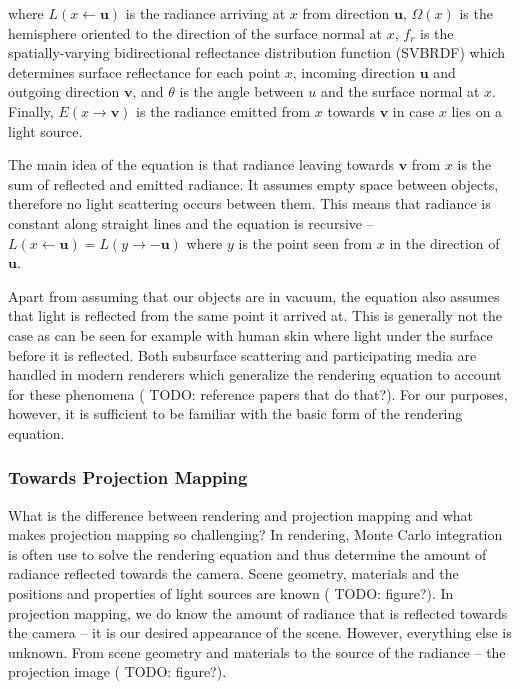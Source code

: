 where \(L(x \leftarrow \mathbf{u})\) is the radiance arriving at \(x\) from direction \(\mathbf{u}\), \(\Omega(x)\) is the hemisphere oriented to the direction of the surface normal at \(x\), \(f_r\) is the spatially-varying bidirectional reflectance distribution function (SVBRDF) which determines surface reflectance for each point \(x\), incoming direction \(\mathbf{u}\) and outgoing direction \(\mathbf{v}\), and \(\theta\) is the angle between \(u\) and the surface normal at \(x\). Finally, \(E(x \rightarrow \mathbf{v})\) is the radiance emitted from \(x\) towards \(\mathbf{v}\) in case \(x\) lies on a light source.

The main idea of the equation is that radiance leaving towards \(\mathbf{v}\) from \(x\) is the sum of reflected and emitted radiance. It assumes empty space between objects, therefore no light scattering occurs between them. This means that radiance is constant along straight lines and the equation is recursive -- \(L(x \leftarrow \mathbf{u}) = L(y \rightarrow -\mathbf{u})\) where \(y\) is the point seen from \(x\) in the direction of \(\mathbf{u}\).

Apart from assuming that our objects are in vacuum, the equation also assumes that light is reflected from the same point it arrived at. This is generally not the case as can be seen for example with human skin where light under the surface before it is reflected. Both subsurface scattering and participating media are handled in modern renderers which generalize the rendering equation to account for these phenomena ({\color{red} TODO: reference papers that do that?}). For our purposes, however, it is sufficient to be familiar with the basic form of the rendering equation.

\subsubsection{Towards Projection Mapping}
\label{section:background-projection_mapping-light_transport-towards_projection_mapping}

What is the difference between rendering and projection mapping and what makes projection mapping so challenging? In rendering, Monte Carlo integration is often use to solve the rendering equation and thus determine the amount of radiance reflected towards the camera. Scene geometry, materials and the positions and properties of light sources are known ({\color{red} TODO: figure?}). In projection mapping, we do know the amount of radiance that is reflected towards the camera -- it is our desired appearance of the scene. However, everything else is unknown. From scene geometry and materials to the source of the radiance -- the projection image ({\color{red} TODO: figure?}).

